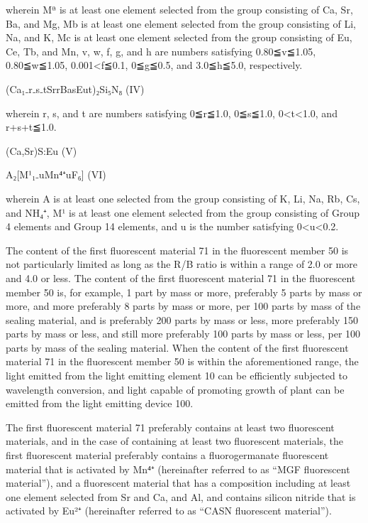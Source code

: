 \documentclass[11pt,a4paper]{article}
\begin{document}
wherein Mª is at least one element selected from the group consisting of Ca, Sr, Ba, and Mg, Mb is at least one element selected from the group consisting of Li, Na, and K, Mc is at least one element selected from the group consisting of Eu, Ce, Tb, and Mn, v, w, f, g, and h are numbers satisfying 0.80≦v≦1.05, 0.80≦w≦1.05, 0.001<f≦0.1, 0≦g≦0.5, and 3.0≦h≦5.0, respectively.

(Ca₁₋r₋s₋tSrrBasEut)₂Si₅N₈ (IV)

wherein r, s, and t are numbers satisfying 0≦r≦1.0, 0≦s≦1.0, 0<t<1.0, and r+s+t≦1.0.

(Ca,Sr)S:Eu (V)

A₂[M¹₁₋uMn⁴⁺uF₆] (VI)

wherein A is at least one selected from the group consisting of K, Li, Na, Rb, Cs, and NH₄⁺, M¹ is at least one element selected from the group consisting of Group 4 elements and Group 14 elements, and u is the number satisfying 0<u<0.2.

The content of the first fluorescent material 71 in the fluorescent member 50 is not particularly limited as long as the R/B ratio is within a range of 2.0 or more and 4.0 or less. The content of the first fluorescent material 71 in the fluorescent member 50 is, for example, 1 part by mass or more, preferably 5 parts by mass or more, and more preferably 8 parts by mass or more, per 100 parts by mass of the sealing material, and is preferably 200 parts by mass or less, more preferably 150 parts by mass or less, and still more preferably 100 parts by mass or less, per 100 parts by mass of the sealing material. When the content of the first fluorescent material 71 in the fluorescent member 50 is within the aforementioned range, the light emitted from the light emitting element 10 can be efficiently subjected to wavelength conversion, and light capable of promoting growth of plant can be emitted from the light emitting device 100.

The first fluorescent material 71 preferably contains at least two fluorescent materials, and in the case of containing at least two fluorescent materials, the first fluorescent material preferably contains a fluorogermanate fluorescent material that is activated by Mn⁴⁺ (hereinafter referred to as “MGF fluorescent material”), and a fluorescent material that has a composition including at least one element selected from Sr and Ca, and Al, and contains silicon nitride that is activated by Eu²⁺ (hereinafter referred to as “CASN fluorescent material”).
\end{document}
